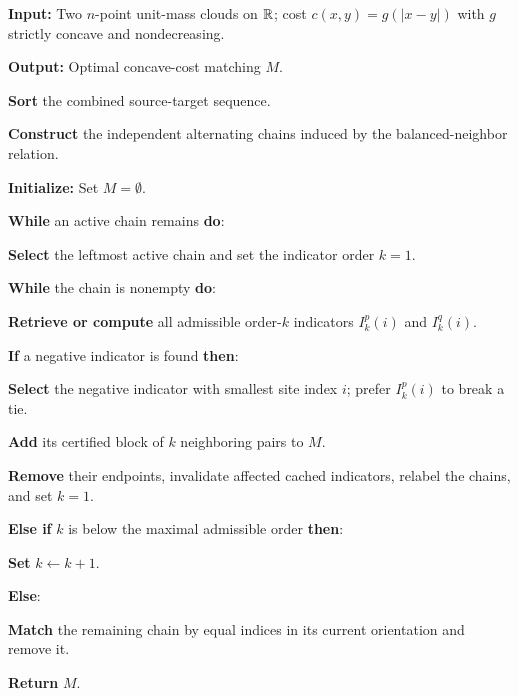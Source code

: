 \begin{alg}\label{alg:concave-line-local-indicators}
\textbf{Input:} Two $n$-point unit-mass clouds on $\mathbb{R}$; cost $c(x,y)=g(|x-y|)$ with $g$ strictly concave and nondecreasing.

\textbf{Output:} Optimal concave-cost matching $M$.

\textbf{Sort} the combined source-target sequence.

\textbf{Construct} the independent alternating chains induced by the balanced-neighbor relation.

\textbf{Initialize:} Set $M=\emptyset$.

\textbf{While} an active chain remains \textbf{do}:
\begin{algblock}

\textbf{Select} the leftmost active chain and set the indicator order $k=1$.

\textbf{While} the chain is nonempty \textbf{do}:
\begin{algblock}

\textbf{Retrieve or compute} all admissible order-$k$ indicators $I_k^p(i)$ and $I_k^q(i)$.

\textbf{If} a negative indicator is found \textbf{then}:
\begin{algblock}

\textbf{Select} the negative indicator with smallest site index $i$; prefer $I_k^p(i)$ to break a tie.

\textbf{Add} its certified block of $k$ neighboring pairs to $M$.

\textbf{Remove} their endpoints, invalidate affected cached indicators, relabel the chains, and set $k=1$.

\end{algblock}
\textbf{Else if} $k$ is below the maximal admissible order \textbf{then}:
\begin{algblock}
\textbf{Set} $k\leftarrow k+1$.
\end{algblock}
\textbf{Else}:
\begin{algblock}
\textbf{Match} the remaining chain by equal indices in its current orientation and remove it.
\end{algblock}

\end{algblock}

\end{algblock}
\algreturnskip
\textbf{Return} $M$.
\end{alg}

